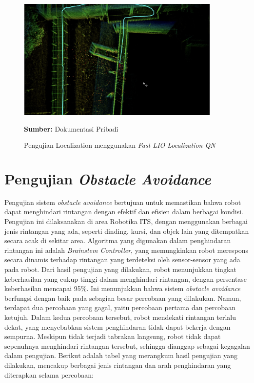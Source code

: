 \begin{figure}[H]
    \centering
    \includegraphics[width=0.9\textwidth]{gambar/bab4/localization.png}
    \caption{Pengujian Localization menggunakan \emph{Fast-LIO Localization QN}}
    \label{fig:localization_example}
    \footnotesize{\textbf{Sumber:} Dokumentasi Pribadi}
\end{figure}

\section{Pengujian \emph{Obstacle Avoidance}}

Pengujian sistem \emph{obstacle avoidance} bertujuan untuk memastikan bahwa robot dapat menghindari rintangan dengan efektif dan efisien dalam berbagai kondisi. Pengujian ini dilaksanakan di area Robotika ITS, dengan menggunakan berbagai jenis rintangan yang ada, seperti dinding, kursi, dan objek lain yang ditempatkan secara acak di sekitar area. Algoritma yang digunakan dalam penghindaran rintangan ini adalah \emph{Brainstem Controller}, yang memungkinkan robot merespons secara dinamis terhadap rintangan yang terdeteksi oleh sensor-sensor yang ada pada robot.  Dari hasil pengujian yang dilakukan, robot menunjukkan tingkat keberhasilan yang cukup tinggi dalam menghindari rintangan, dengan persentase keberhasilan mencapai 95\%. Ini menunjukkan bahwa sistem \emph{obstacle avoidance} berfungsi dengan baik pada sebagian besar percobaan yang dilakukan. Namun, terdapat dua percobaan yang gagal, yaitu percobaan pertama dan percobaan ketujuh. Dalam kedua percobaan tersebut, robot mendekati rintangan terlalu dekat, yang menyebabkan sistem penghindaran tidak dapat bekerja dengan sempurna. Meskipun tidak terjadi tabrakan langsung, robot tidak dapat sepenuhnya menghindari rintangan tersebut, sehingga dianggap sebagai kegagalan dalam pengujian.  Berikut adalah tabel yang merangkum hasil pengujian yang dilakukan, mencakup berbagai jenis rintangan dan arah penghindaran yang diterapkan selama percobaan:


